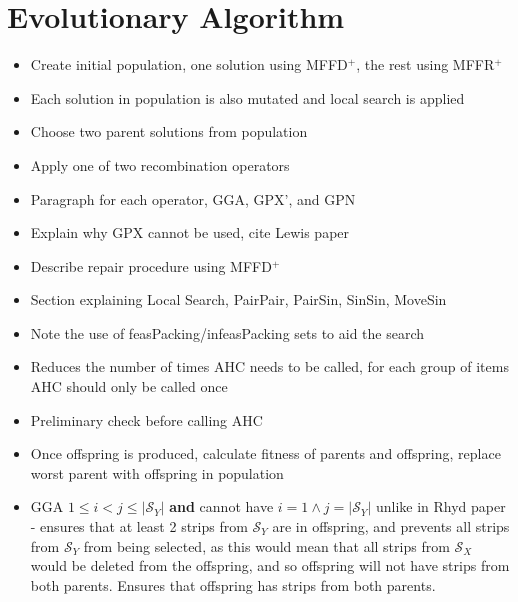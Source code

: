 \documentclass{elsarticle}
\begin{document}
\section{Evolutionary Algorithm}
\begin{itemize}
	\item Create initial population, one solution using MFFD$^+$, the rest using MFFR$^+$
	\item Each solution in population is also mutated and local search is applied
	\item Choose two parent solutions from population
	\item Apply one of two recombination operators
	\item Paragraph for each operator, GGA, GPX', and GPN
	\item Explain why GPX cannot be used, cite Lewis paper
	\item Describe repair procedure using MFFD$^+$
	\item Section explaining Local Search, PairPair, PairSin, SinSin, MoveSin
	\item Note the use of feasPacking/infeasPacking sets to aid the search
	\item Reduces the number of times AHC needs to be called, for each group of items AHC should only be called once
	\item Preliminary check before calling AHC
	\item Once offspring is produced, calculate fitness of parents and offspring, replace worst parent with offspring in population
	\item GGA $1 \leq i < j \leq |\mathcal{S}_Y|$ \textbf{and} cannot have $i = 1 \land j = |\mathcal{S}_Y|$ unlike in Rhyd paper - ensures that at least 2 strips from $\mathcal{S}_Y$ are in offspring, and prevents all strips from $\mathcal{S}_Y$ from being selected, as this would mean that all strips from $\mathcal{S}_X$ would be deleted from the offspring, and so offspring will not have strips from both parents. Ensures that offspring has strips from both parents.
\end{itemize}
\end{document}

